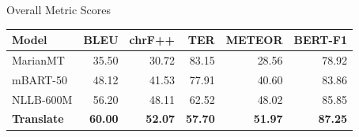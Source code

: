 \documentclass{beamer}
\begin{document}
\begin{frame}{Overall Metric Scores}
  \centering
  \renewcommand{\arraystretch}{1.4}
  \begin{tabular}{lrrrrr}
    \toprule
    \textbf{Model} & \textbf{BLEU} & \textbf{chrF++} & \textbf{TER} & \textbf{METEOR} & \textbf{BERT-F1} \\
    \midrule
    MarianMT & 35.50 & 30.72 & 83.15 & 28.56 & 78.92 \\
    mBART-50     & 48.12 & 41.53 & 77.91 & 40.60 & 83.86 \\
    NLLB-600M   & 56.20 & 48.11 & 62.52 & 48.02 & 85.85 \\
    \textbf{Translate} & \textbf{60.00} & \textbf{52.07} & \textbf{57.70} & \textbf{51.97} & \textbf{87.25} \\
    \bottomrule
  \end{tabular}
\end{frame}
\end{document}
